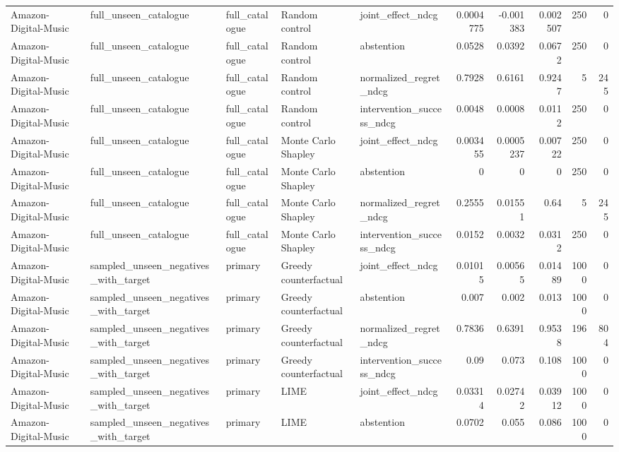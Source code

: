 \begin{table}[t]
{\begin{tabular}{lllllrrrrr}
Amazon-Digital-Music & full\_unseen\_catalogue & full\_catalogue & Random control & joint\_effect\_ndcg & 0.0004775 & -0.001383 & 0.002507 & 250 & 0 \\
Amazon-Digital-Music & full\_unseen\_catalogue & full\_catalogue & Random control & abstention & 0.0528 & 0.0392 & 0.0672 & 250 & 0 \\
Amazon-Digital-Music & full\_unseen\_catalogue & full\_catalogue & Random control & normalized\_regret\_ndcg & 0.7928 & 0.6161 & 0.9247 & 5 & 245 \\
Amazon-Digital-Music & full\_unseen\_catalogue & full\_catalogue & Random control & intervention\_success\_ndcg & 0.0048 & 0.0008 & 0.0112 & 250 & 0 \\
Amazon-Digital-Music & full\_unseen\_catalogue & full\_catalogue & Monte Carlo Shapley & joint\_effect\_ndcg & 0.003455 & 0.0005237 & 0.00722 & 250 & 0 \\
Amazon-Digital-Music & full\_unseen\_catalogue & full\_catalogue & Monte Carlo Shapley & abstention & 0 & 0 & 0 & 250 & 0 \\
Amazon-Digital-Music & full\_unseen\_catalogue & full\_catalogue & Monte Carlo Shapley & normalized\_regret\_ndcg & 0.2555 & 0.01551 & 0.64 & 5 & 245 \\
Amazon-Digital-Music & full\_unseen\_catalogue & full\_catalogue & Monte Carlo Shapley & intervention\_success\_ndcg & 0.0152 & 0.0032 & 0.0312 & 250 & 0 \\
Amazon-Digital-Music & sampled\_unseen\_negatives\_with\_target & primary & Greedy counterfactual & joint\_effect\_ndcg & 0.01015 & 0.00565 & 0.01489 & 1000 & 0 \\
Amazon-Digital-Music & sampled\_unseen\_negatives\_with\_target & primary & Greedy counterfactual & abstention & 0.007 & 0.002 & 0.013 & 1000 & 0 \\
Amazon-Digital-Music & sampled\_unseen\_negatives\_with\_target & primary & Greedy counterfactual & normalized\_regret\_ndcg & 0.7836 & 0.6391 & 0.9538 & 196 & 804 \\
Amazon-Digital-Music & sampled\_unseen\_negatives\_with\_target & primary & Greedy counterfactual & intervention\_success\_ndcg & 0.09 & 0.073 & 0.108 & 1000 & 0 \\
Amazon-Digital-Music & sampled\_unseen\_negatives\_with\_target & primary & LIME & joint\_effect\_ndcg & 0.03314 & 0.02742 & 0.03912 & 1000 & 0 \\
Amazon-Digital-Music & sampled\_unseen\_negatives\_with\_target & primary & LIME & abstention & 0.0702 & 0.055 & 0.086 & 1000 & 0 \\

\end{tabular}}
\end{table}
